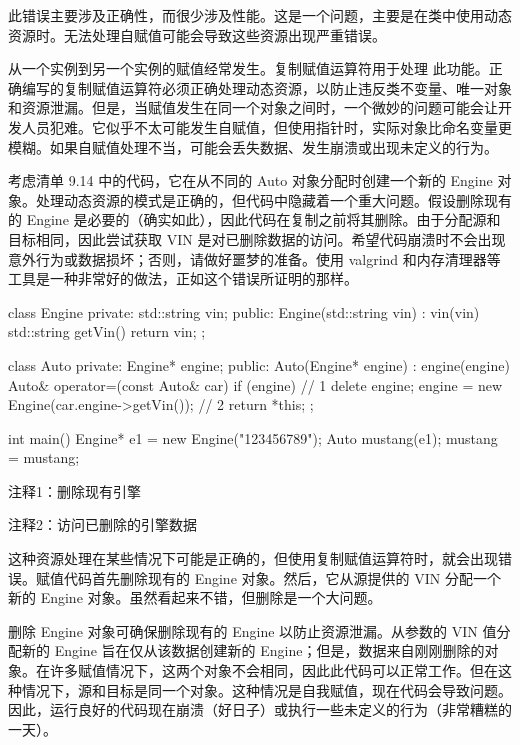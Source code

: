 此错误主要涉及正确性，而很少涉及性能。这是一个问题，主要是在类中使用动态资源时。无法处理自赋值可能会导致这些资源出现严重错误。

从一个实例到另一个实例的赋值经常发生。复制赋值运算符用于处理 此功能。正确编写的复制赋值运算符必须正确处理动态资源，以防止违反类不变量、唯一对象和资源泄漏。但是，当赋值发生在同一个对象之间时，一个微妙的问题可能会让开发人员犯难。它似乎不太可能发生自赋值，但使用指针时，实际对象比命名变量更 模糊。如果自赋值处理不当，可能会丢失数据、发生崩溃或出现未定义的行为。


考虑清单 9.14 中的代码，它在从不同的 Auto 对象分配时创建一个新的 Engine 对象。处理动态资源的模式是正确的，但代码中隐藏着一个重大问题。假设删除现有的 Engine 是必要的（确实如此），因此代码在复制之前将其删除。由于分配源和目标相同，因此尝试获取 VIN 是对已删除数据的访问。希望代码崩溃时不会出现意外行为或数据损坏；否则，请做好噩梦的准备。使用 valgrind 和内存清理器等工具是一种非常好的做法，正如这个错误所证明的那样。


\begin{cpp}
class Engine {
private:
  std::string vin;
public:
  Engine(std::string vin) : vin(vin) {}
  std::string getVin() { return vin; }
};

class Auto {
private:
  Engine* engine;
public:
  Auto(Engine* engine) : engine(engine) {}
  Auto& operator=(const Auto& car) {
    if (engine) // 1
      delete engine;
    engine = new Engine(car.engine->getVin()); // 2
    return *this;
  }
};

int main() {
  Engine* e1 = new Engine("123456789");
  Auto mustang(e1);
  mustang = mustang;
}
\end{cpp}

{\footnotesize
注释1：删除现有引擎

注释2：访问已删除的引擎数据
}


这种资源处理在某些情况下可能是正确的，但使用复制赋值运算符时，就会出现错误。赋值代码首先删除现有的 Engine 对象。然后，它从源提供的 VIN 分配一个新的 Engine 对象。虽然看起来不错，但删除是一个大问题。

删除 Engine 对象可确保删除现有的 Engine 以防止资源泄漏。从参数的 VIN 值分配新的 Engine 旨在仅从该数据创建新的 Engine；但是，数据来自刚刚删除的对象。在许多赋值情况下，这两个对象不会相同，因此此代码可以正常工作。但在这种情况下，源和目标是同一个对象。这种情况是自我赋值，现在代码会导致问题。因此，运行良好的代码现在崩溃（好日子）或执行一些未定义的行为（非常糟糕的一天）。

